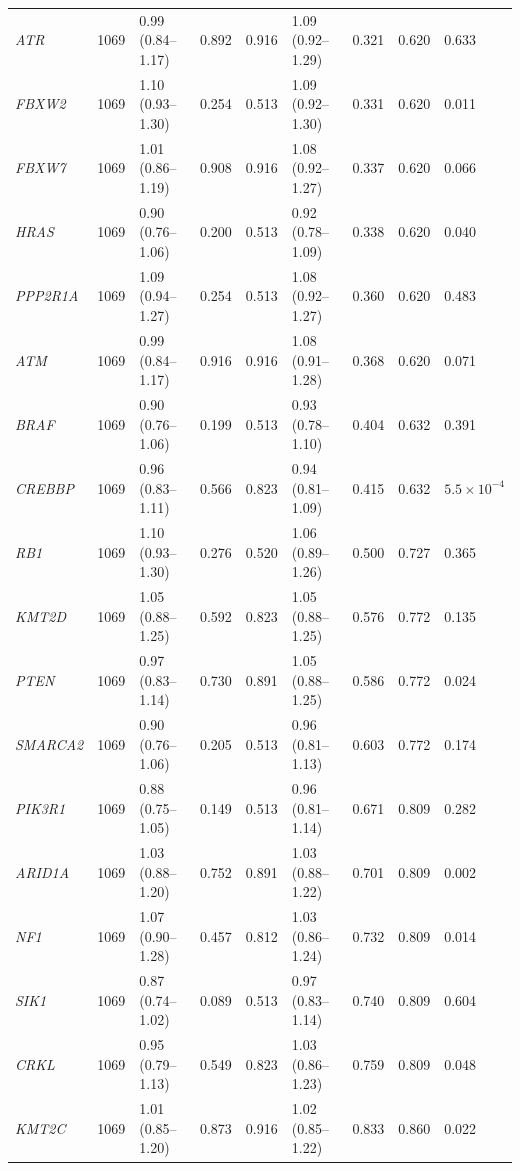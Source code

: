 \documentclass[11pt,a4paper]{article}
\begin{document}
\begin{table}[H]
\begin{tabular}{lrlllllll}
\textit{ATR} & 1069 & 0.99 (0.84--1.17) & 0.892 & 0.916 & 1.09 (0.92--1.29) & 0.321 & 0.620 & 0.633 \\
\textit{FBXW2} & 1069 & 1.10 (0.93--1.30) & 0.254 & 0.513 & 1.09 (0.92--1.30) & 0.331 & 0.620 & 0.011 \\
\textit{FBXW7} & 1069 & 1.01 (0.86--1.19) & 0.908 & 0.916 & 1.08 (0.92--1.27) & 0.337 & 0.620 & 0.066 \\
\textit{HRAS} & 1069 & 0.90 (0.76--1.06) & 0.200 & 0.513 & 0.92 (0.78--1.09) & 0.338 & 0.620 & 0.040 \\
\textit{PPP2R1A} & 1069 & 1.09 (0.94--1.27) & 0.254 & 0.513 & 1.08 (0.92--1.27) & 0.360 & 0.620 & 0.483 \\
\textit{ATM} & 1069 & 0.99 (0.84--1.17) & 0.916 & 0.916 & 1.08 (0.91--1.28) & 0.368 & 0.620 & 0.071 \\
\textit{BRAF} & 1069 & 0.90 (0.76--1.06) & 0.199 & 0.513 & 0.93 (0.78--1.10) & 0.404 & 0.632 & 0.391 \\
\textit{CREBBP} & 1069 & 0.96 (0.83--1.11) & 0.566 & 0.823 & 0.94 (0.81--1.09) & 0.415 & 0.632 & $5.5\times 10^{-4}$ \\
\textit{RB1} & 1069 & 1.10 (0.93--1.30) & 0.276 & 0.520 & 1.06 (0.89--1.26) & 0.500 & 0.727 & 0.365 \\
\textit{KMT2D} & 1069 & 1.05 (0.88--1.25) & 0.592 & 0.823 & 1.05 (0.88--1.25) & 0.576 & 0.772 & 0.135 \\
\textit{PTEN} & 1069 & 0.97 (0.83--1.14) & 0.730 & 0.891 & 1.05 (0.88--1.25) & 0.586 & 0.772 & 0.024 \\
\textit{SMARCA2} & 1069 & 0.90 (0.76--1.06) & 0.205 & 0.513 & 0.96 (0.81--1.13) & 0.603 & 0.772 & 0.174 \\
\textit{PIK3R1} & 1069 & 0.88 (0.75--1.05) & 0.149 & 0.513 & 0.96 (0.81--1.14) & 0.671 & 0.809 & 0.282 \\
\textit{ARID1A} & 1069 & 1.03 (0.88--1.20) & 0.752 & 0.891 & 1.03 (0.88--1.22) & 0.701 & 0.809 & 0.002 \\
\textit{NF1} & 1069 & 1.07 (0.90--1.28) & 0.457 & 0.812 & 1.03 (0.86--1.24) & 0.732 & 0.809 & 0.014 \\
\textit{SIK1} & 1069 & 0.87 (0.74--1.02) & 0.089 & 0.513 & 0.97 (0.83--1.14) & 0.740 & 0.809 & 0.604 \\
\textit{CRKL} & 1069 & 0.95 (0.79--1.13) & 0.549 & 0.823 & 1.03 (0.86--1.23) & 0.759 & 0.809 & 0.048 \\
\textit{KMT2C} & 1069 & 1.01 (0.85--1.20) & 0.873 & 0.916 & 1.02 (0.85--1.22) & 0.833 & 0.860 & 0.022 \\

\end{tabular}
\end{table}
\end{document}
